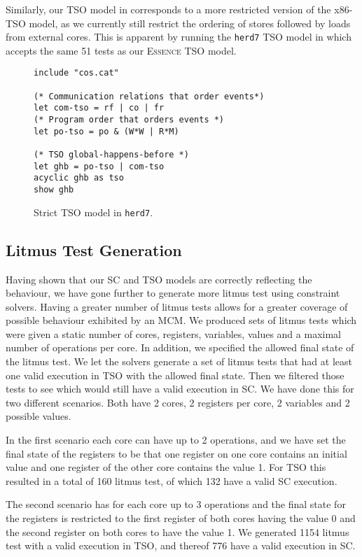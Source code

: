 \documentclass[runningheads]{llncs}
\newcommand{\essence}[0]{\textsc{Essence}}
\begin{document}
Similarly, our TSO model in  corresponds to a more restricted version of the x86-TSO model, as we currently still restrict the ordering of stores followed by loads from external cores.
This is apparent by running the {\tt{herd7}} TSO model in  which accepts the same 51 tests as our \essence{} TSO model.
\begin{figure}
\begin{lstlisting}
include "cos.cat"

(* Communication relations that order events*)
let com-tso = rf | co | fr
(* Program order that orders events *)
let po-tso = po & (W*W | R*M)

(* TSO global-happens-before *)
let ghb = po-tso | com-tso
acyclic ghb as tso
show ghb
\end{lstlisting}
\caption{Strict TSO model in {\tt{herd7}}.\label{fig:herdTSO}}
\end{figure}



\subsection{Litmus Test Generation}
Having shown that our SC and TSO models are correctly reflecting the behaviour, we have gone further to generate more litmus test using constraint solvers.
Having a greater number of litmus tests allows for a greater coverage of possible behaviour exhibited by an MCM.
We produced sets of litmus tests which were given a static number of cores, registers, variables, values and a maximal number of operations per core.
In addition, we specified the allowed final state of the litmus test.
We let the solvers generate a set of litmus tests that had at least one valid execution in TSO with the allowed final state.
Then we filtered those tests to see which would still have a valid execution in SC.
We have done this for two different scenarios.
Both have 2 cores, 2 registers per core, 2 variables and 2 possible values.

In the first scenario each core can have up to 2 operations, and we have set the final state of the registers to be that one register on one core contains an initial value and one register of the other core contains the value 1.
For TSO this resulted in a total of 160 litmus test, of which 132 have a valid SC execution.

The second scenario has for each core up to 3 operations and the final state for the registers is restricted to the first register of both cores having the value 0 and the second register on both cores to have the value 1.
We generated 1154 litmus test with a valid execution in TSO, and thereof 776 have a valid execution in SC.
\end{document}
